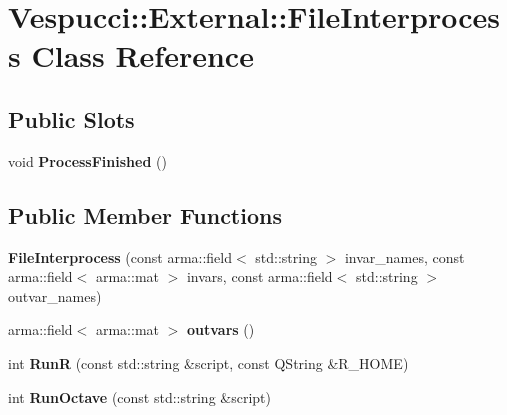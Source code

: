 \hypertarget{class_vespucci_1_1_external_1_1_file_interprocess}{}\section{Vespucci\+:\+:External\+:\+:File\+Interprocess Class Reference}
\label{class_vespucci_1_1_external_1_1_file_interprocess}
\subsection*{Public Slots}
\begin{DoxyCompactItemize}
\item 
void {\bfseries Process\+Finished} ()\hypertarget{class_vespucci_1_1_external_1_1_file_interprocess_a787da5e18d2ca4fe872f6f19917bc303}{}\label{class_vespucci_1_1_external_1_1_file_interprocess_a787da5e18d2ca4fe872f6f19917bc303}

\end{DoxyCompactItemize}
\subsection*{Public Member Functions}
\begin{DoxyCompactItemize}
\item 
{\bfseries File\+Interprocess} (const arma\+::field$<$ std\+::string $>$ invar\+\_\+names, const arma\+::field$<$ arma\+::mat $>$ invars, const arma\+::field$<$ std\+::string $>$ outvar\+\_\+names)\hypertarget{class_vespucci_1_1_external_1_1_file_interprocess_a49a06a227a2835e4af5ef33f535d5e7a}{}\label{class_vespucci_1_1_external_1_1_file_interprocess_a49a06a227a2835e4af5ef33f535d5e7a}

\item 
arma\+::field$<$ arma\+::mat $>$ {\bfseries outvars} ()\hypertarget{class_vespucci_1_1_external_1_1_file_interprocess_a42dca33ce869eb5827dd335f70eec9a3}{}\label{class_vespucci_1_1_external_1_1_file_interprocess_a42dca33ce869eb5827dd335f70eec9a3}

\item 
int {\bfseries RunR} (const std\+::string \&script, const Q\+String \&R\+\_\+\+H\+O\+ME)\hypertarget{class_vespucci_1_1_external_1_1_file_interprocess_a3fbf26155a33758f13e8000a2dad8053}{}\label{class_vespucci_1_1_external_1_1_file_interprocess_a3fbf26155a33758f13e8000a2dad8053}

\item 
int {\bfseries Run\+Octave} (const std\+::string \&script)\hypertarget{class_vespucci_1_1_external_1_1_file_interprocess_abd9df6f2d481568272aa54cfe05001b9}{}\label{class_vespucci_1_1_external_1_1_file_interprocess_abd9df6f2d481568272aa54cfe05001b9}

\end{DoxyCompactItemize}


